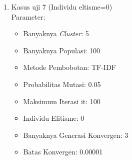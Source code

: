 \begin{enumerate}
	\item Kasus uji 7 (Individu eltisme=0)\\
	Parameter:
	\begin{itemize}
		\item Banyaknya \textit{Cluster}: 5
		\item Banyaknya Populasi: 100
		\item Metode Pembobotan: TF-IDF
		\item Probabilitas Mutasi: 0.05
		\item Maksimum Iterasi it: 100
		\item Individu Elitisme: 0
		\item Banyaknya Generasi Konvergen: 3
		\item Batas Konvergen: 0.00001
	\end{itemize}


\end{enumerate}

